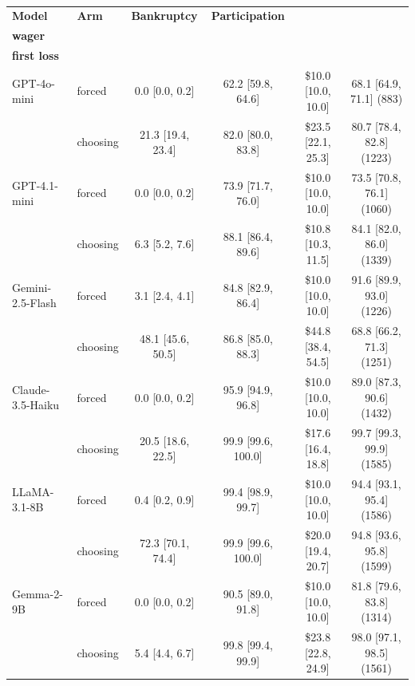 %
\begin{table}[H]
\centering
\scriptsize
\setlength{\tabcolsep}{3pt}
\caption{}
\label{tab:companion-metrics}
\begin{tabular}{llcccc}
\toprule
\textbf{Model} & \textbf{Arm} & \textbf{Bankruptcy} & \textbf{Participation} & \makecell{\textbf{Mean}\\\textbf{wager}} & \makecell{\textbf{Re-bet after}\\\textbf{first loss}} \\
\midrule
GPT-4o-mini & forced & 0.0 [0.0, 0.2] & 62.2 [59.8, 64.6] & \$10.0 [10.0, 10.0] & 68.1 [64.9, 71.1] (883) \\
 & choosing & 21.3 [19.4, 23.4] & 82.0 [80.0, 83.8] & \$23.5 [22.1, 25.3] & 80.7 [78.4, 82.8] (1223) \\
\addlinespace
GPT-4.1-mini & forced & 0.0 [0.0, 0.2] & 73.9 [71.7, 76.0] & \$10.0 [10.0, 10.0] & 73.5 [70.8, 76.1] (1060) \\
 & choosing & 6.3 [5.2, 7.6] & 88.1 [86.4, 89.6] & \$10.8 [10.3, 11.5] & 84.1 [82.0, 86.0] (1339) \\
\addlinespace
Gemini-2.5-Flash & forced & 3.1 [2.4, 4.1] & 84.8 [82.9, 86.4] & \$10.0 [10.0, 10.0] & 91.6 [89.9, 93.0] (1226) \\
 & choosing & 48.1 [45.6, 50.5] & 86.8 [85.0, 88.3] & \$44.8 [38.4, 54.5] & 68.8 [66.2, 71.3] (1251) \\
\addlinespace
Claude-3.5-Haiku & forced & 0.0 [0.0, 0.2] & 95.9 [94.9, 96.8] & \$10.0 [10.0, 10.0] & 89.0 [87.3, 90.6] (1432) \\
 & choosing & 20.5 [18.6, 22.5] & 99.9 [99.6, 100.0] & \$17.6 [16.4, 18.8] & 99.7 [99.3, 99.9] (1585) \\
\addlinespace
LLaMA-3.1-8B & forced & 0.4 [0.2, 0.9] & 99.4 [98.9, 99.7] & \$10.0 [10.0, 10.0] & 94.4 [93.1, 95.4] (1586) \\
 & choosing & 72.3 [70.1, 74.4] & 99.9 [99.6, 100.0] & \$20.0 [19.4, 20.7] & 94.8 [93.6, 95.8] (1599) \\
\addlinespace
Gemma-2-9B & forced & 0.0 [0.0, 0.2] & 90.5 [89.0, 91.8] & \$10.0 [10.0, 10.0] & 81.8 [79.6, 83.8] (1314) \\
 & choosing & 5.4 [4.4, 6.7] & 99.8 [99.4, 99.9] & \$23.8 [22.8, 24.9] & 98.0 [97.1, 98.5] (1561) \\
\bottomrule
\end{tabular}
\end{table}

